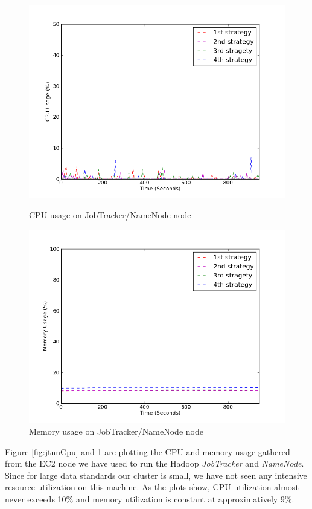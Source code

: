 \documentclass[11pt,a4paper,twoside]{report}
\begin{document}
\begin{figure}[ht]
\begin{minipage}[b]{0.47\linewidth}
\centering
\includegraphics[scale=0.36]{jtnn-cpu}
\caption{CPU usage on JobTracker/NameNode node}
\label{fig:jtnnCpu}
\end{minipage}
\hspace{0.2cm}
\begin{minipage}[b]{0.5\linewidth}
\centering
\includegraphics[scale=0.36]{jtnn-mem}
\caption{Memory usage on JobTracker/NameNode node}
\label{fig:jtnnMem}
\end{minipage}
\end{figure}

Figure \ref{fig:jtnnCpu} and \ref{fig:jtnnMem} are plotting the CPU and memory usage gathered from the EC2 node we have used to run the Hadoop \textit{JobTracker} and \textit{NameNode}. Since for large data standards our cluster is small, we have not seen any intensive resource utilization on this machine. As the plots show, CPU utilization almost never exceeds 10\% and memory utilization is constant at approximatively 9\%.
\end{document}
